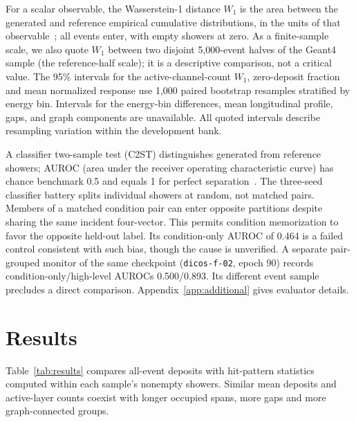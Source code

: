 \documentclass[10pt]{article}
\begin{document}
For a scalar observable, the Wasserstein-1 distance $W_1$ is the area between the generated and reference empirical cumulative distributions, in the units of that observable~\cite{kansalmetrics}; all events enter, with empty showers at zero. As a finite-sample scale, we also quote $W_1$ between two disjoint 5,000-event halves of the Geant4 sample (the reference-half scale); it is a descriptive comparison, not a critical value. The 95\% intervals for the active-channel-count $W_1$, zero-deposit fraction and mean normalized response use 1,000 paired bootstrap resamples stratified by energy bin. Intervals for the energy-bin differences, mean longitudinal profile, gaps, and graph components are unavailable. All quoted intervals describe resampling variation within the development bank.

A classifier two-sample test (C2ST) distinguishes generated from reference showers; AUROC (area under the receiver operating characteristic curve) has chance benchmark 0.5 and equals 1 for perfect separation~\cite{c2st,kansalmetrics}. The three-seed classifier battery splits individual showers at random, not matched pairs. Members of a matched condition pair can enter opposite partitions despite sharing the same incident four-vector. This permits condition memorization to favor the opposite held-out label. Its condition-only AUROC of 0.464 is a failed control consistent with such bias, though the cause is unverified. A separate pair-grouped monitor of the same checkpoint (\texttt{dicos-f-02}, epoch 90) records condition-only/high-level AUROCs 0.500/0.893. Its different event sample precludes a direct comparison. Appendix~\ref{app:additional} gives evaluator details.

\section{Results}
\label{sec:results}

Table~\ref{tab:results} compares all-event deposits with hit-pattern statistics computed within each sample's nonempty showers. Similar mean deposits and active-layer counts coexist with longer occupied spans, more gaps and more graph-connected groups.
\end{document}
